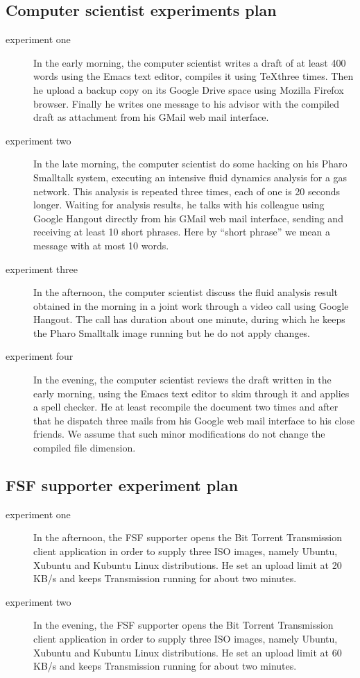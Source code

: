 \documentclass[10pt,a4paper]{article}
\begin{document}
    \subsection{Computer scientist experiments plan}
    \begin{description}
    \item[experiment one] In the early morning, the computer scientist
      writes a draft of at least 400 words using the Emacs text
      editor, compiles it using \TeX three times. Then he upload a
      backup copy on its Google Drive space using Mozilla Firefox
      browser. Finally he writes one message to his advisor with the
      compiled draft as attachment from his GMail web mail interface.
    \item[experiment two] In the late morning, the computer scientist
      do some hacking on his Pharo Smalltalk system, executing an
      intensive fluid dynamics analysis for a gas network. This
      analysis is repeated three times, each of one is 20 seconds
      longer. Waiting for analysis results, he talks with his
      colleague using Google Hangout directly from his GMail web mail
      interface, sending and receiving at least 10 short phrases. Here
      by ``short phrase'' we mean a message with at most 10 words.
    \item[experiment three] In the afternoon, the computer scientist
      discuss the fluid analysis result obtained in the morning in a
      joint work through a video call using Google Hangout. The call
      has duration about one minute, during which he keeps the Pharo
      Smalltalk image running but he do not apply changes.
    \item[experiment four] In the evening, the computer scientist
      reviews the draft written in the early morning, using the Emacs
      text editor to skim through it and applies a spell checker. He
      at least recompile the document two times and after that he
      dispatch three mails from his Google web mail interface to his
      close friends. We assume that such minor modifications do not
      change the compiled file dimension.
    \end{description}

    \subsection{FSF supporter experiment plan}
    \begin{description}
    \item[experiment one] In the afternoon, the FSF supporter opens
      the Bit Torrent Transmission client application in order to
      supply three ISO images, namely Ubuntu, Xubuntu and Kubuntu
      Linux distributions. He set an upload limit at 20 KB/s and keeps
      Transmission running for about two minutes.
    \item[experiment two] In the evening, the FSF supporter opens the
      Bit Torrent Transmission client application in order to supply
      three ISO images, namely Ubuntu, Xubuntu and Kubuntu Linux
      distributions. He set an upload limit at 60 KB/s and keeps
      Transmission running for about two minutes.
    \end{description}
\end{document}
